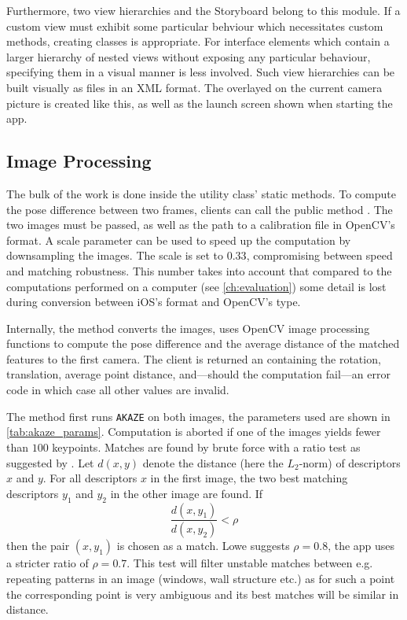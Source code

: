 Furthermore, two view hierarchies and the Storyboard belong to this module.  If
a custom view must exhibit some particular behviour which necessitates custom
methods, creating classes is appropriate. For interface elements which contain a
larger hierarchy of nested views without exposing any particular behaviour,
specifying them in a visual manner is less involved. Such view hierarchies can
be built visually as  files in an XML format. The
 overlayed on the current camera picture is created like
this, as well as the launch screen shown when starting the app.


\subsection{Image Processing}


The bulk of the work is done inside the utility class'  static
methods. To compute the pose difference between two frames, clients can call the
public method
.
The two images must be passed, as well as the path to a calibration file in
OpenCV's  format. A scale parameter can be used to speed up
the computation by downsampling the images.  The scale is set to $0.33$,
compromising between speed and matching robustness. This number takes into
account that compared to the computations performed on a computer (see
\autoref{ch:evaluation}) some detail is lost during conversion between iOS's
 format and OpenCV's  type.

Internally, the method converts the images, uses OpenCV image processing
functions to compute the pose difference and the average distance of the matched
features to the first camera. The client is returned an 
containing the rotation, translation, average point distance, and---should the
computation fail---an error code in which case all other values are invalid.

The method first runs \texttt{AKAZE} on both images, the parameters used are
shown in \autoref{tab:akaze_params}.  Computation is aborted if one of the
images yields fewer than $100$ keypoints.  Matches are found by brute force with
a ratio test as suggested by \citet{lowe2004}. Let $d(x,y)$ denote the distance
(here the $L_2$-norm) of descriptors $x$ and $y$. For all descriptors $x$ in the
first image, the two best matching descriptors $y_1$ and $y_2$ in the other
image are found. If
\begin{equation*}
   \frac{d(x,y_1)}{d(x,y_2)} < \rho
\end{equation*}
then the pair $(x,y_1)$ is chosen as a match. Lowe suggests $\rho=0.8$, the app
uses a stricter ratio of $\rho=0.7$. This test will filter unstable matches
between e.g. repeating patterns in an image (windows, wall structure etc.) as
for such a point the corresponding point is very ambiguous and its best matches
will be similar in distance.

